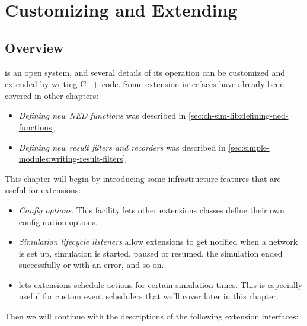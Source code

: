 \chapter{Customizing and Extending {\opp}}
\label{cha:plugin-exts}

\section{Overview}

{\opp} is an open system, and several details of its operation can be
customized and extended by writing C++ code. Some extension interfaces
have already been covered in other chapters:

\begin{itemize}
   \item \textit{Defining new NED functions} was described in
     \ref{sec:ch-sim-lib:defining-ned-functions}
   \item \textit{Defining new result filters and recorders} was described
     in \ref{sec:simple-modules:writing-result-filters}
\end{itemize}

This chapter will begin by introducing some infrastructure features that
are useful for extensions:

\begin{itemize}
   \item \textit{Config options}. This facility lets other extensions classes
     define their own configuration options.
   \item \textit{Simulation lifecycle listeners} allow extensions to get
     notified when a network is set up, simulation is started, paused or resumed,
     the simulation ended successfully or with an error, and so on.
   \item {} lets extensions schedule actions for certain simulation
     times. This is especially useful for custom event schedulers that we'll
     cover later in this chapter.
\end{itemize}

Then we will continue with the descriptions of the following extension
interfaces:


